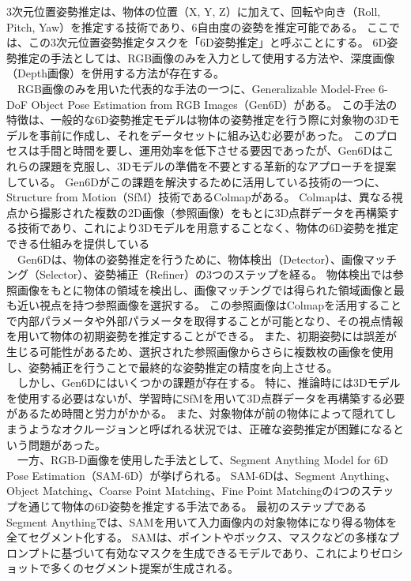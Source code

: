 3次元位置姿勢推定は、物体の位置（X, Y, Z）に加えて、回転や向き（Roll, Pitch, Yaw）を推定する技術であり、6自由度の姿勢を推定可能である。
ここでは、この3次元位置姿勢推定タスクを「6D姿勢推定」と呼ぶことにする。
6D姿勢推定の手法としては、RGB画像のみを入力として使用する方法や、深度画像（Depth画像）を併用する方法が存在する。\\
　RGB画像のみを用いた代表的な手法の一つに、Generalizable Model-Free 6-DoF Object Pose Estimation from RGB Images（Gen6D）がある。
この手法の特徴は、一般的な6D姿勢推定モデルは物体の姿勢推定を行う際に対象物の3Dモデルを事前に作成し、それをデータセットに組み込む必要があった。
このプロセスは手間と時間を要し、運用効率を低下させる要因であったが、Gen6Dはこれらの課題を克服し、3Dモデルの準備を不要とする革新的なアプローチを提案している。
Gen6Dがこの課題を解決するために活用している技術の一つに、Structure from Motion（SfM）技術であるColmapがある。
Colmapは、異なる視点から撮影された複数の2D画像（参照画像）をもとに3D点群データを再構築する技術であり、これにより3Dモデルを用意することなく、物体の6D姿勢を推定できる仕組みを提供している\\
　Gen6Dは、物体の姿勢推定を行うために、物体検出（Detector）、画像マッチング（Selector）、姿勢補正（Refiner）の3つのステップを経る。
物体検出では参照画像をもとに物体の領域を検出し、画像マッチングでは得られた領域画像と最も近い視点を持つ参照画像を選択する。
この参照画像はColmapを活用することで内部パラメータや外部パラメータを取得することが可能となり、その視点情報を用いて物体の初期姿勢を推定することができる。
また、初期姿勢には誤差が生じる可能性があるため、選択された参照画像からさらに複数枚の画像を使用し、姿勢補正を行うことで最終的な姿勢推定の精度を向上させる。\\
　しかし、Gen6Dにはいくつかの課題が存在する。
特に、推論時には3Dモデルを使用する必要はないが、学習時にSfMを用いて3D点群データを再構築する必要があるため時間と労力がかかる。
また、対象物体が前の物体によって隠れてしまうようなオクルージョンと呼ばれる状況では、正確な姿勢推定が困難になるという問題があった。\\
　一方、RGB-D画像を使用した手法として、Segment Anything Model for 6D Pose Estimation（SAM-6D）が挙げられる。
SAM-6Dは、Segment Anything、Object Matching、Coarse Point Matching、Fine Point Matchingの4つのステップを通じて物体の6D姿勢を推定する手法である。
最初のステップであるSegment Anythingでは、SAMを用いて入力画像内の対象物体になり得る物体を全てセグメント化する。
SAMは、ポイントやボックス、マスクなどの多様なプロンプトに基づいて有効なマスクを生成できるモデルであり、これによりゼロショットで多くのセグメント提案が生成される。
